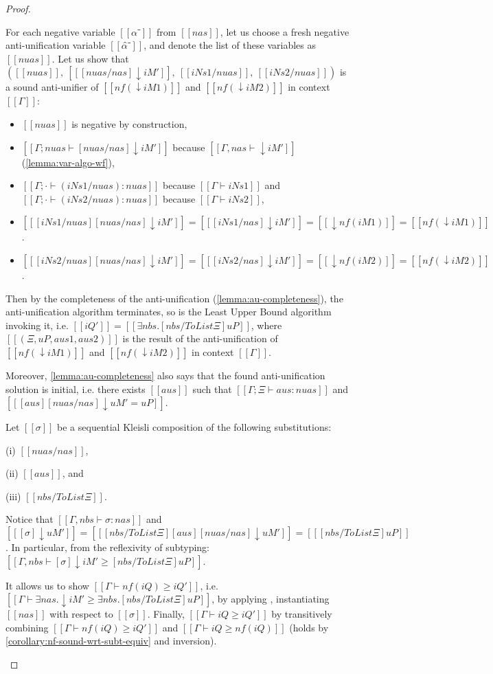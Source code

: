 \begin{proof}
\begin{caseof}
      For each negative variable $[[α⁻]]$ from $[[nas]]$, let us choose a
      fresh negative anti-unification variable $[[α̂⁻]]$, and denote the
      list of these variables as $[[nuas]]$.
      Let us show that $([[nuas]],~ [[ [nuas/nas]↓iM' ]],~ [[iNs1/nuas]],~ [[iNs2/nuas]])$ is a
      sound anti-unifier of $[[nf(↓iM1)]]$ and $[[nf(↓iM2)]]$ in context $[[Γ]]$:

      \begin{itemize}
        \item $[[nuas]]$ is negative by construction,
        \item $[[Γ ; {nuas} ⊢ [nuas/nas]↓iM']]$ because $[[Γ, nas ⊢ ↓iM']]$ 
        (\cref{lemma:var-algo-wf}),
        \item $[[Γ ; · ⊢ (iNs1/nuas) :{nuas}]]$ because $[[Γ ⊢ iNs1]]$ and
          $[[Γ ; · ⊢ (iNs2/nuas) :{nuas}]]$ because $[[Γ ⊢ iNs2]]$,
        \item $[[ [iNs1/nuas] [nuas/nas] ↓iM' ]] = [[ [iNs1/nas] ↓iM' ]] =
          [[↓nf(iM1)]] = [[nf(↓iM1)]]$.
        \item $[[ [iNs2/nuas] [nuas/nas] ↓iM' ]] = [[ [iNs2/nas] ↓iM' ]] = [[↓nf(iM2)]] = [[nf(↓iM2)]]$.
      \end{itemize}

      Then by the completeness of the anti-unification
      (\cref{lemma:au-completeness}), the anti-unification algorithm
      terminates, so is the Least Upper Bound algorithm invoking it, 
      i.e. $[[iQ']] = [[∃nbs.[nbs / ToList Ξ]uP]]$, where
      $[[(Ξ, uP, aus1, aus2)]]$ is the result of the anti-unification
      of $[[nf(↓iM1)]]$ and $[[nf(↓iM2)]]$ in context $[[Γ]]$.

      Moreover, \cref{lemma:au-completeness} also says that the found anti-unification 
      solution is initial, i.e. there exists $[[aus]]$ such that
      $[[Γ;Ξ ⊢ aus :{nuas}]]$ and $[[ [aus][nuas/nas]↓uM' = uP ]]$.

      Let $[[σ]]$ be a sequential Kleisli composition of the following
      substitutions:
      \begin{enumerate*}
      \item[(i)] $[[nuas/nas]]$,
      \item[(ii)] $[[aus]]$, and
      \item[(iii)] $[[nbs / ToList Ξ]]$.
      \end{enumerate*}
      Notice that $[[Γ, nbs ⊢ σ :{nas}]]$
      and $[[ [σ]↓uM' ]] = [[ [nbs / ToList Ξ][aus][nuas/nas]↓uM' ]] = [[ [nbs /
      ToList Ξ]uP ]]$. In particular, from the reflexivity of subtyping:
      $[[Γ, nbs ⊢ [σ]↓iM' ≥ [nbs / ToList Ξ]uP]]$.

      It allows us to show $[[Γ ⊢ nf(iQ) ≥ iQ']]$, i.e. $[[Γ ⊢ ∃nas.↓iM' ≥
      ∃nbs.[nbs / ToList Ξ]uP]]$, by applying ,
      instantiating $[[nas]]$ with respect to $[[σ]]$. Finally, $[[Γ ⊢ iQ ≥ iQ']]$
      by transitively combining $[[Γ ⊢ nf(iQ) ≥ iQ']]$ and $[[Γ ⊢ iQ ≥ nf(iQ)]]$ 
      (holds by \cref{corollary:nf-sound-wrt-subt-equiv} and inversion).
  \end{caseof}
\end{proof}